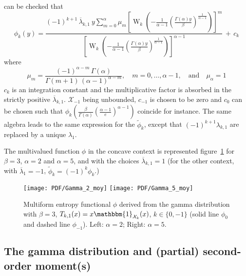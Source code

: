 \documentclass[english,onecolumn]{elsarticle}
\def\X{\mathcal{X}}
\def\un{\mathbbm{1}}
\def\W{\operatorname{W}}
\begin{document}
can be checked that
%
\[
\phi_k(y) = \frac{\displaystyle (-1)^{k+1} \, \overline{\lambda}_{k,1} \: y
\sum_{m=0}^\alpha \mu_m \left[\W_k\left(- \frac{1}{\alpha-1} \left(
\frac{\Gamma(\alpha) y}{\beta} \right)^{\frac{1}{\alpha-1}} \right)
\right]^m}{\left[\W_k\left(- \frac{1}{\alpha-1} \left( \frac{\Gamma(\alpha)
y}{\beta} \right)^{\frac{1}{\alpha-1}} \right) \right]^{\alpha-1}} \, + \, c_k
\]
%
where
%
\[
\mu_m = \frac{(-1)^{\alpha-m} \, \Gamma(\alpha)}{\Gamma(m+1) \,
(\alpha-1)^{\alpha-m}}, \quad m = 0, \ldots, \alpha-1, \quad \mbox{and} \quad
\mu_\alpha = 1
\]
%
$c_k$ is  an integration constant and  the multiplicative factor  is absorbed in
the  strictly  positive  $\overline{\lambda}_{k,1}$. $\X_{-1}$  being  unbounded,
$c_{-1}$ is  chosen to be zero and  $c_0$ can be chosen  such that $\phi_k\left(
  \frac{\beta}{\Gamma(\alpha)}   \left(   \frac{\alpha-1}{e}  \right)^{\alpha-1}
\right)$  coincide  for  instance. The same algebra leads to the same expression for the $\widetilde{\phi}_k$, except that $(-1)^{k+1} \lambda_{k,1}$ are replaced by a unique $\lambda_1$.

The  multivalued   function  $\phi$  in  the  concave   context  is  represented
figure~\ref{fig:Entropy-gamma-moy} for $\beta  = 3$, $\alpha = 2$  and $\alpha =
5$, and with the choices  $\overline{\lambda}_{k,1} = 1$ (for the other context,
with $\overline{\lambda}_1 = -1$, $\widetilde{\phi}_k = (-1)^k \phi_k$.)
%
\begin{figure}[htbp]
\centerline{
\texttt{[image: PDF/Gamma\_2\_moy]} \hspace{2mm}
\texttt{[image: PDF/Gamma\_5\_moy]}}
%
\caption{Multiform entropy functional $\phi$ derived from the gamma distribution
  with $\beta = 3$,  $T_{k,1}(x) = x \un_{\X_k}(x)$, $k \in \{0  , -1 \}$ (solid
  line $\phi_0$ and dashed line $\phi_{-1}$). Left: $\alpha = 2$; Right: $\alpha
  = 5$.}
\label{fig:Entropy-gamma-moy}
\end{figure}
%



\subsection{The gamma distribution and (partial) second-order moment(s)}
\label{subsec:GammaSecondOrder}
\end{document}

